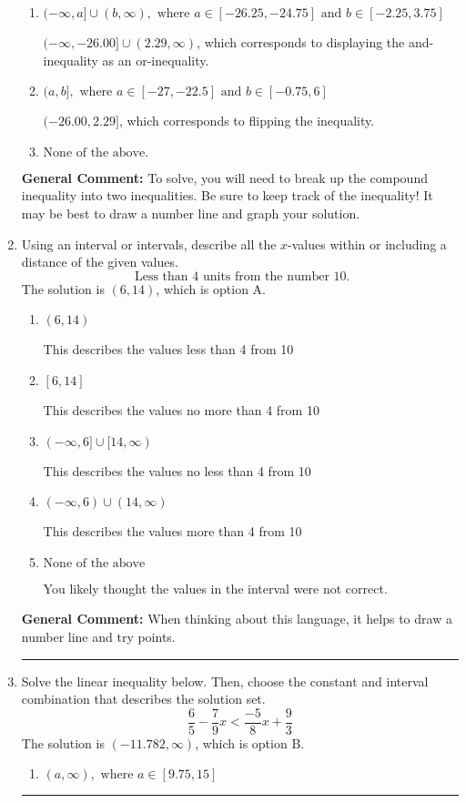 \documentclass{extbook}[14pt]
\newcommand{\litem}[1]{\item #1

\rule{\textwidth}{0.4pt}}
\begin{document}
\begin{enumerate}
{\begin{enumerate}[label=\Alph*.]
$[-26.00, 2.29)$, which is the correct option.
\item \( (-\infty, a] \cup (b, \infty), \text{ where } a \in [-26.25, -24.75] \text{ and } b \in [-2.25, 3.75] \)

$(-\infty, -26.00] \cup (2.29, \infty)$, which corresponds to displaying the and-inequality as an or-inequality.
\item \( (a, b], \text{ where } a \in [-27, -22.5] \text{ and } b \in [-0.75, 6] \)

$(-26.00, 2.29]$, which corresponds to flipping the inequality.
\item \( \text{None of the above.} \)


\end{enumerate}

\textbf{General Comment:} To solve, you will need to break up the compound inequality into two inequalities. Be sure to keep track of the inequality! It may be best to draw a number line and graph your solution.
}
\litem{
Using an interval or intervals, describe all the $x$-values within or including a distance of the given values.
\[ \text{ Less than } 4 \text{ units from the number } 10. \]The solution is \( (6, 14) \), which is option A.\begin{enumerate}[label=\Alph*.]
\item \( (6, 14) \)

This describes the values less than 4 from 10
\item \( [6, 14] \)

This describes the values no more than 4 from 10
\item \( (-\infty, 6] \cup [14, \infty) \)

This describes the values no less than 4 from 10
\item \( (-\infty, 6) \cup (14, \infty) \)

This describes the values more than 4 from 10
\item \( \text{None of the above} \)

You likely thought the values in the interval were not correct.
\end{enumerate}

\textbf{General Comment:} When thinking about this language, it helps to draw a number line and try points.
}
\litem{
Solve the linear inequality below. Then, choose the constant and interval combination that describes the solution set.
\[ \frac{6}{5} - \frac{7}{9} x < \frac{-5}{8} x + \frac{9}{3} \]The solution is \( (-11.782, \infty) \), which is option B.\begin{enumerate}[label=\Alph*.]
\item \( (a, \infty), \text{ where } a \in [9.75, 15] \)


\end{enumerate}}
\end{enumerate}
\end{document}
